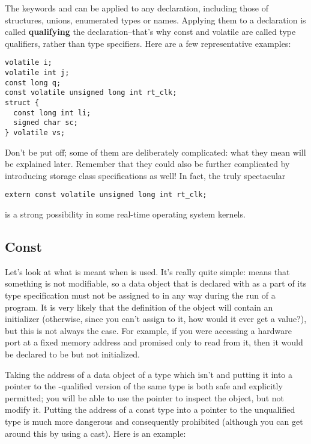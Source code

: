   The keywords \const{} and \volatile{} can be
   applied to any declaration, including those of structures, unions,
   enumerated types or \typedef{} names. Applying them to
   a declaration is called \textbf{qualifying} the declaration--that's
   why const and volatile are called type qualifiers, rather than type
   specifiers. Here are a few representative examples:


\begin{Verbatim}
volatile i;
volatile int j;
const long q;
const volatile unsigned long int rt_clk;
struct {
  const long int li;
  signed char sc;
} volatile vs;
\end{Verbatim}

  Don't be put off; some of them are deliberately complicated: what they
   mean will be explained later. Remember that they could also be further
   complicated by introducing storage class specifications as well! In fact,
   the truly spectacular


\begin{Verbatim}
extern const volatile unsigned long int rt_clk;
\end{Verbatim}

  is a strong possibility in some real-time operating system kernels.


  \subsection{Const}
   

   Let's look at what is meant when \const{} is used. It's
    really quite simple: \const{} means that something is not
    modifiable, so a data object that is declared with \const{} as
    a part of its type specification must not be assigned to in any way
    during the run of a program. It is very likely that the definition of
    the object will contain an initializer (otherwise, since you can't
    assign to it, how would it ever get a value?), but this is not always
    the case. For example, if you were accessing a hardware port at a fixed
    memory address and promised only to read from it, then it would be
    declared to be \const{} but not initialized.


   Taking the address of a data object of a type which isn't
    \const{} and putting it into a pointer to the
    \const-qualified version of the same type is both safe and
    explicitly permitted; you will be able to use the pointer to inspect the
    object, but not modify it. Putting the address of a const type into
    a pointer to the unqualified type is much more dangerous and
    consequently prohibited (although you can get around this by using
    a cast). Here is an example:


